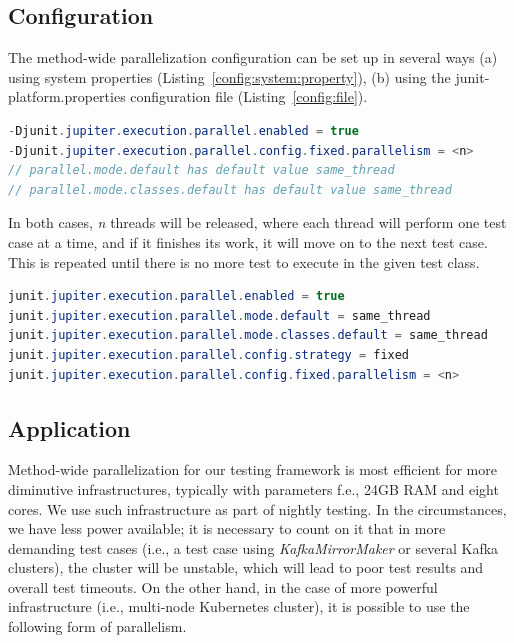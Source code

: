 \subsection{Configuration}
\label{05:sub:sec:configuration}

The method-wide parallelization configuration can be set up in several ways (a) using system properties (Listing~\ref{config:system:property}),
(b) using the junit-platform.properties configuration file (Listing~\ref{config:file}).
\begin{lstlisting}[language= Java,label=config:system:property,caption=(a) Configuration via system properties,frame=tb]
-Djunit.jupiter.execution.parallel.enabled = true
-Djunit.jupiter.execution.parallel.config.fixed.parallelism = <n>
// parallel.mode.default has default value same_thread
// parallel.mode.classes.default has default value same_thread
\end{lstlisting}
In both cases, \emph{n} threads will be released, where each thread will perform one test case at a time, and if it finishes its work,
it will move on to the next test case. This is repeated until there is no more test to execute in the given test class.
\begin{lstlisting}[language=Java,label=config:file,caption=(b) Configuration via file,frame = tb]
junit.jupiter.execution.parallel.enabled = true
junit.jupiter.execution.parallel.mode.default = same_thread
junit.jupiter.execution.parallel.mode.classes.default = same_thread
junit.jupiter.execution.parallel.config.strategy = fixed
junit.jupiter.execution.parallel.config.fixed.parallelism = <n>
\end{lstlisting}

\subsection{Application}
\label{05:sub:sec:applicability}

Method-wide parallelization for our testing framework is most efficient for more diminutive infrastructures,
typically with parameters f.e., 24GB RAM and eight cores. We use such infrastructure as part of nightly testing.
In the circumstances, we have less power available; it is necessary to count on it that in more demanding test cases
(i.e., a test case using \emph{KafkaMirrorMaker} or several Kafka clusters), the cluster will be unstable, which will
lead to poor test results and overall test timeouts. On the other hand, in the case of more powerful infrastructure
(i.e., multi-node Kubernetes cluster), it is possible to use the following form of parallelism.


